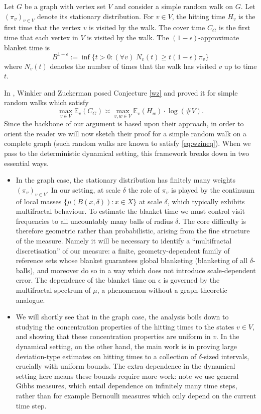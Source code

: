\documentclass[11pt, reqno]{amsart}
\numberwithin{equation}{section}
\theoremstyle{plain}%
\theoremstyle{definition}
\def\E{\mathbb E}
\theoremstyle{nonumberplain}
\begin{document}
Let $G$ be a graph with vertex set $V$ and consider a simple random walk on $G$. Let $(\pi_v)_{v\in V}$ denote its stationary distribution. For $v \in V$, the hitting time $H_v$ is the first time that the vertex $v$ is visited by the walk.  The cover time $C_G$ is the first time that each vertex in $V$ is visited by the walk. The $(1-\epsilon)$-approximate blanket time is 
$$B^{1-\epsilon}:=\inf\{t>0: (\forall v) \; N_v(t) \geq t(1-\epsilon)\pi_v\}$$
where $N_v(t)$ denotes the number of times that the walk has visited $v$ up to time $t$. 

In \cite{WinZuc96}, Winkler and Zuckerman posed Conjecture \ref{wz} and proved it for simple random walks which satisfy
\begin{equation} \label{eq:wzineq}
\max_{v \in V} \E_v(C_G)\asymp\max_{v,w \in V} \E_v(H_w) \cdot \log(\# V).
\end{equation}
Since the backbone of our argument is based upon their approach, in order to orient the reader we will now sketch their proof for a simple random walk on a complete graph (such random walks are known to satisfy \eqref{eq:wzineq}). When we pass to the deterministic dynamical setting, this framework breaks down in two essential ways.

\begin{itemize}
\item In the graph case, the stationary distribution has finitely many weights $(\pi_v)_{v\in V}$. In our setting, at scale $\delta$ the role of $\pi_v$ is played by the continuum of local masses $\{\mu(B(x,\delta)) : x\in X\}$ at scale $\delta$, which typically exhibits multifractal behaviour. To estimate the blanket time we must control visit frequencies to all uncountably many balls of radius $\delta$. The core difficulty is therefore geometric rather than probabilistic, arising from the fine structure of the measure. Namely it will be necessary to identify a ``multifractal discretisation'' of our measure: a finite, geometry-dependent family of reference sets whose blanket guarantees global blanketing (blanketing of all $\delta$-balls), and moreover do so in a way which does not introduce scale-dependent error. The dependence of the blanket time on $\epsilon$ is governed by the multifractal spectrum of $\mu$, a phenomenon without a graph-theoretic analogue.
\item We will shortly see that in the graph case, the analysis boils down to studying the concentration properties of the hitting times to the states $v \in V$, and showing that these concentration properties are uniform in $v$.  In the dynamical setting, on the other hand, the main work is in proving large deviation-type estimates on hitting times to a collection of $\delta$-sized intervals, crucially with uniform bounds. The extra dependence in the dynamical setting here means these bounds require more work: note we use general Gibbs measures, which entail dependence on infinitely many time steps, rather than for example Bernoulli measures which only depend on the current time step.
 \end{itemize}  
\end{document}
